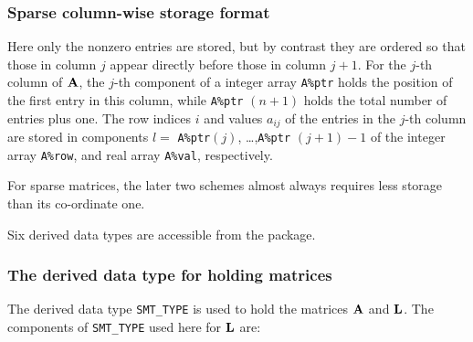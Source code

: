 \documentclass{galahad}
\begin{document}
\subsubsection{Sparse column-wise storage format}\label{colwise}
Here only the nonzero entries are stored, but by contrast
they are ordered so that those in column $j$ appear directly before those
in column $j+1$. For the $j$-th column of ${\mathbf{A}}$, the $j$-th component of a 
integer array {\tt A\%ptr} holds the position of the first entry in this column,
while {\tt A\%ptr} $(n+1)$ holds the total number of entries plus one.
The row indices $i$ and values $a_{ij}$ of the entries in the $j$-th column
are stored in components 
$l =$ {\tt A\%ptr}$(j)$, \ldots ,{\tt A\%ptr} $(j+1)-1$ of the 
integer array {\tt A\%row}, and real array {\tt A\%val}, respectively. 

For sparse matrices, the later two schemes almost always requires less storage 
than its co-ordinate one.



\galtypes
Six derived data types are accessible from the package.


\subsubsection{The derived data type for holding matrices}\label{typesmt}
The derived data type {\tt SMT\_TYPE} is used to hold the matrices ${\mathbf{A}}$
and ${\mathbf{L}}$. The components of {\tt SMT\_TYPE} used here for ${\mathbf{L}}$
are:
\end{document}
